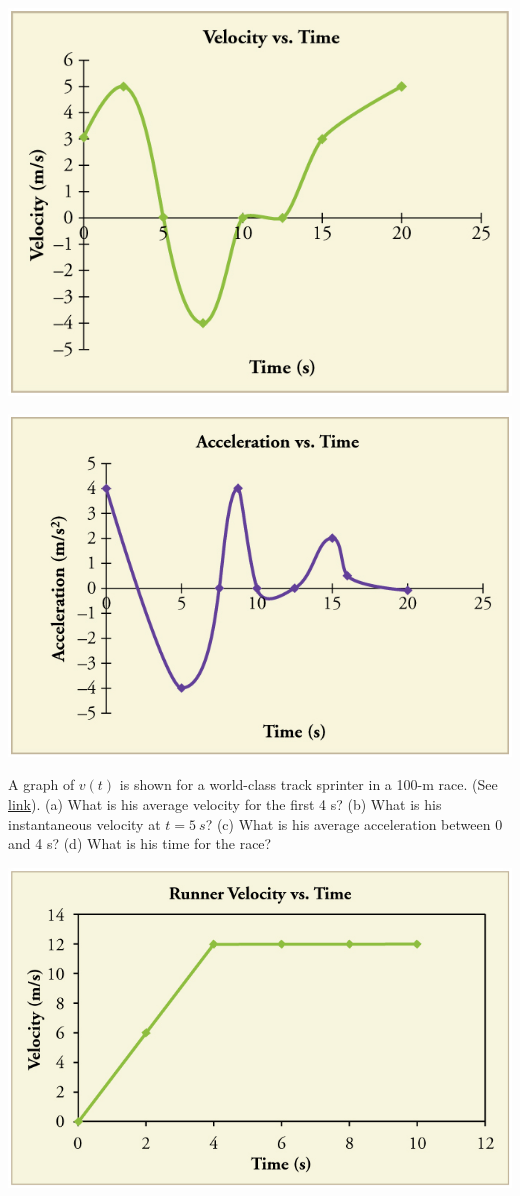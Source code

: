 \documentclass[
]{book}
\newenvironment{problems-exercises}{}{}
\begin{document}
\begin{problems-exercises}
\includegraphics{images/Figure_02_08Sol_17.jpg}

\includegraphics{images/Figure_02_08Sol_18.jpg}

\hypertarget{fs-id3520768}{}
\leavevmode\hypertarget{fs-id1434602}{}%
A graph of \({v\left( t \right)}{}\) is shown for a world-class track
sprinter in a 100-m race. (See
\protect\hyperlink{import-auto-id4125036}{link}). (a) What is his
average velocity for the first 4 s? (b) What is his instantaneous
velocity at \({t = 5\ s}{}\)? (c) What is his average acceleration between
0 and 4 s? (d) What is his time for the race?

\includegraphics{images/Figure_02_08Sol_20.jpg}


\end{problems-exercises}
\end{document}
